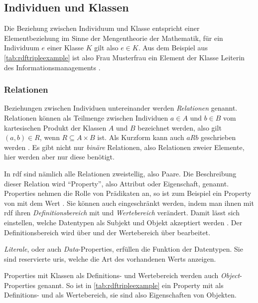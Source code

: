 \subsection{Individuen und Klassen}
\label{sec:individuenundklassen}
Die Beziehung zwischen Individuum und Klasse entspricht einer Elementbeziehung im Sinne der Mengentheorie der Mathematik, für ein Individuum $e$ einer Klasse $K$ gilt also $e \in K$.
Aus dem Beispiel aus \cref{tab:rdftripleexample} ist also Frau Musterfrau ein Element der Klasse Leiterin des Informationsmanagements \citep[S.~261]{semanticwebgrundlagen}.

\subsubsection{Relationen}
Beziehungen zwischen Individuen untereinander werden \emph{Relationen} genannt.
Relationen können als Teilmenge zwischen Individuen $a \in A$ und $b \in B$ vom kartesischen Produkt der Klassen $A$ und $B$ bezeichnet werden,
also gilt $(a,b) \in R$, wenn $R \subseteq A \times B$ ist.
Als Kurzform kann auch $aRb$ geschrieben werden \citep[S.~263]{semanticwebgrundlagen}.
Es gibt nicht nur \emph{binäre} Relationen, also Relationen zweier Elemente, hier werden aber nur diese benötigt.

In \ac{rdf} sind nämlich alle Relationen zweistellig, also Paare.
Die Beschreibung dieser Relation wird \enquote{Property}, also Attribut oder Eigenschaft, genannt.
Properties nehmen die Rolle von Prädikaten an, so ist zum Beispiel  ein Property von  mit dem Wert .
Sie können auch eingeschränkt werden, indem man ihnen mit \ac{rdf} ihren \emph{Definitionsbereich} mit und \emph{Wertebereich} verändert.
Damit lässt sich einstellen, welche Datentypen als Subjekt und Objekt akzeptiert werden \citep[S.~76]{semanticwebgrundlagen}.
Der Definitionsbereich wird über  und der Wertebereich über  bearbeitet.

\emph{Literale}, oder auch \emph{Data}-Properties, erfüllen die Funktion der Datentypen.
Sie sind reservierte \acp{uri}, welche die Art des vorhandenen Werts anzeigen.

Properties mit Klassen als Definitions- und Wertebereich werden auch \emph{Object}-Properties genannt.
So ist in \cref{tab:rdftripleexample}  ein Property mit  als Definitions- und  als Wertebereich,
sie sind also Eigenschaften von Objekten.

